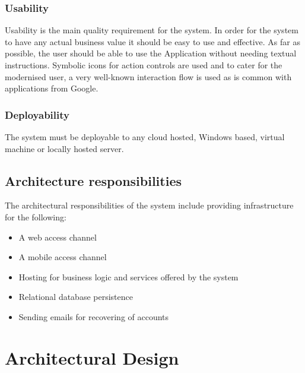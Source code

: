 \documentclass[11pt,a4paper,titlepage]{article}
\begin{document}
		\subsubsection{Usability}
			Usability is the main quality requirement for the system. In order for the system to have any actual business value it should be easy to use and effective. As far as possible, the user should be able to use the Application without needing textual instructions. Symbolic icons for action controls are used and to cater for the modernised user, a very well-known interaction flow is used as is common with applications from Google.
		\subsubsection{Deployability}
			The system must be deployable to any cloud hosted, Windows based, virtual machine or locally hosted server.
	\subsection{Architecture responsibilities}
	The architectural responsibilities of the system include providing infrastructure for the following:
		\begin{itemize}
			\item A web access channel
			\item A mobile access channel
			\item Hosting for business logic and services offered by the system
			\item Relational database persistence
			\item Sending emails for recovering of accounts
		\end{itemize}
\section{Architectural Design}
\end{document}
